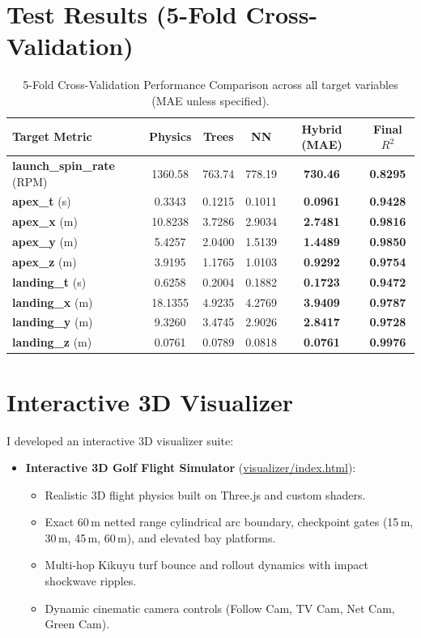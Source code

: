 \documentclass[11pt,a4paper]{article}
\begin{document}
\section{Test Results (5-Fold Cross-Validation)}

\begin{table}[htbp]
\centering
\small
\setlength{\tabcolsep}{5pt}
\begin{tabular}{lccccc}
\toprule
\textbf{Target Metric} & \textbf{Physics} & \textbf{Trees} & \textbf{NN} & \textbf{Hybrid (MAE)} & \textbf{Final $R^2$} \\
\midrule
\textbf{launch\_spin\_rate} (RPM) & 1360.58 & 763.74 & 778.19 & \textbf{730.46} & \textbf{0.8295} \\
\textbf{apex\_t} (s)              & 0.3343  & 0.1215 & 0.1011 & \textbf{0.0961} & \textbf{0.9428} \\
\textbf{apex\_x} (m)              & 10.8238 & 3.7286 & 2.9034 & \textbf{2.7481} & \textbf{0.9816} \\
\textbf{apex\_y} (m)              & 5.4257  & 2.0400 & 1.5139 & \textbf{1.4489} & \textbf{0.9850} \\
\textbf{apex\_z} (m)              & 3.9195  & 1.1765 & 1.0103 & \textbf{0.9292} & \textbf{0.9754} \\
\textbf{landing\_t} (s)           & 0.6258  & 0.2004 & 0.1882 & \textbf{0.1723} & \textbf{0.9472} \\
\textbf{landing\_x} (m)           & 18.1355 & 4.9235 & 4.2769 & \textbf{3.9409} & \textbf{0.9787} \\
\textbf{landing\_y} (m)           & 9.3260  & 3.4745 & 2.9026 & \textbf{2.8417} & \textbf{0.9728} \\
\textbf{landing\_z} (m)           & 0.0761  & 0.0789 & 0.0818 & \textbf{0.0761} & \textbf{0.9976} \\
\bottomrule
\end{tabular}
\caption{5-Fold Cross-Validation Performance Comparison across all target variables (MAE unless specified).}
\end{table}

\section{Interactive 3D Visualizer}

I developed an interactive 3D visualizer suite:
\begin{itemize}
    \item \textbf{Interactive 3D Golf Flight Simulator} (\url{visualizer/index.html}):
    \begin{itemize}
        \item Realistic 3D flight physics built on Three.js and custom shaders.
        \item Exact 60\,m netted range cylindrical arc boundary, checkpoint gates (15\,m, 30\,m, 45\,m, 60\,m), and elevated bay platforms.
        \item Multi-hop Kikuyu turf bounce and rollout dynamics with impact shockwave ripples.
        \item Dynamic cinematic camera controls (Follow Cam, TV Cam, Net Cam, Green Cam).
    \end{itemize}
\end{itemize}
\end{document}
